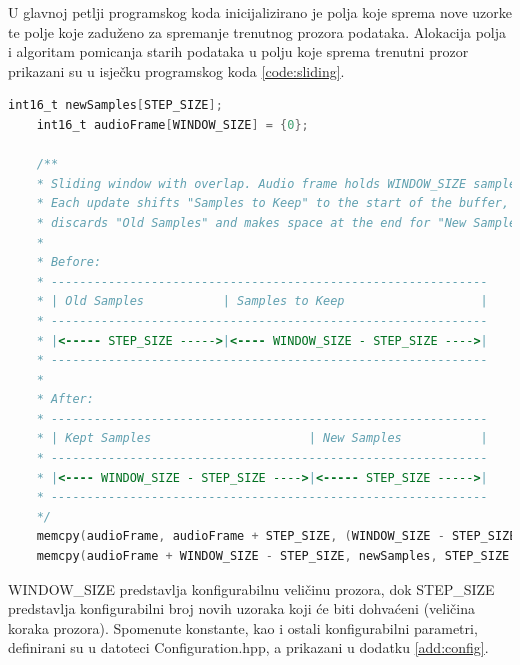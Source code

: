 U glavnoj petlji programskog koda inicijalizirano je polja koje sprema nove uzorke te 
polje koje zaduženo za spremanje trenutnog prozora podataka. Alokacija polja i algoritam
pomicanja starih podataka u polju koje sprema trenutni prozor prikazani su u isječku programskog
koda \ref{code:sliding}.

\begin{lstlisting}[language=C, caption=Sliding Window with Overlap]
    int16_t newSamples[STEP_SIZE];
    int16_t audioFrame[WINDOW_SIZE] = {0};
    
    /**
    * Sliding window with overlap. Audio frame holds WINDOW_SIZE samples.
    * Each update shifts "Samples to Keep" to the start of the buffer,
    * discards "Old Samples" and makes space at the end for "New Samples."
    *
    * Before:
    * -------------------------------------------------------------
    * | Old Samples           | Samples to Keep                   |
    * -------------------------------------------------------------
    * |<----- STEP_SIZE ----->|<---- WINDOW_SIZE - STEP_SIZE ---->|
    * -------------------------------------------------------------
    *
    * After:
    * -------------------------------------------------------------
    * | Kept Samples                      | New Samples           |
    * -------------------------------------------------------------
    * |<---- WINDOW_SIZE - STEP_SIZE ---->|<----- STEP_SIZE ----->|
    * -------------------------------------------------------------
    */
    memcpy(audioFrame, audioFrame + STEP_SIZE, (WINDOW_SIZE - STEP_SIZE) * 2);
    memcpy(audioFrame + WINDOW_SIZE - STEP_SIZE, newSamples, STEP_SIZE * 2);
\end{lstlisting}
\label{code:sliding}

WINDOW\_SIZE predstavlja konfigurabilnu veličinu prozora, dok STEP\_SIZE predstavlja 
konfigurabilni broj novih uzoraka koji će biti dohvaćeni (veličina koraka prozora).
Spomenute konstante, kao i ostali konfigurabilni parametri, definirani su u 
datoteci Configuration.hpp, a prikazani u dodatku \ref{add:config}.

